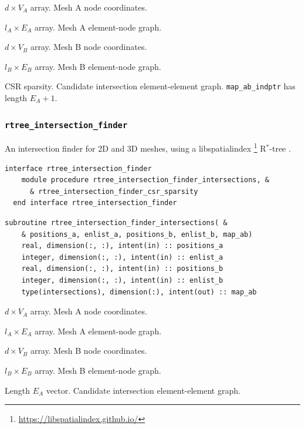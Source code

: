 \documentclass{article}
\begin{document}
\begin{description}[font=\ttfamily\bfseries,leftmargin=2.2\parindent,labelindent=1.7\parindent,noitemsep]
  \item[positions\_a] $d \times V_A$ array. Mesh A node coordinates.
  \item[enlist\_a] $l_A \times E_A$ array. Mesh A element-node graph.
  \item[positions\_b] $d \times V_B$ array. Mesh B node coordinates.
  \item[enlist\_b] $l_B \times E_B$ array. Mesh B element-node graph.
  \item[map\_ab\_indices, map\_ab\_indptr] CSR sparsity. Candidate intersection
    element-element graph. \linebreak \verb+map_ab_indptr+ has length $E_A + 1$.
\end{description}

\subsubsection{\texttt{rtree\_intersection\_finder}}\label{sect:rtree_global}

An intersection finder for 2D and 3D meshes, using a libspatialindex
\footnote{\url{https://libspatialindex.github.io/}} R${}^*$-tree
\citep{guttman1984,beckmann1990}.

\begin{lstlisting}[language=FORTRAN]
  interface rtree_intersection_finder
    module procedure rtree_intersection_finder_intersections, &
      & rtree_intersection_finder_csr_sparsity
  end interface rtree_intersection_finder
\end{lstlisting}

\begin{lstlisting}[language=FORTRAN]
  subroutine rtree_intersection_finder_intersections( &
    & positions_a, enlist_a, positions_b, enlist_b, map_ab)
    real, dimension(:, :), intent(in) :: positions_a
    integer, dimension(:, :), intent(in) :: enlist_a
    real, dimension(:, :), intent(in) :: positions_b
    integer, dimension(:, :), intent(in) :: enlist_b
    type(intersections), dimension(:), intent(out) :: map_ab
\end{lstlisting}

\begin{description}[font=\ttfamily\bfseries,leftmargin=2.2\parindent,labelindent=1.7\parindent,noitemsep]
  \item[positions\_a] $d \times V_A$ array. Mesh A node coordinates.
  \item[enlist\_a] $l_A \times E_A$ array. Mesh A element-node graph.
  \item[positions\_b] $d \times V_B$ array. Mesh B node coordinates.
  \item[enlist\_b] $l_B \times E_B$ array. Mesh B element-node graph.
  \item[map\_ab] Length $E_A$ vector. Candidate intersection element-element
    graph.
\end{description}
\end{document}
